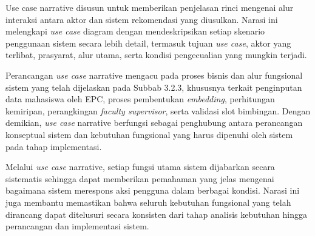 Use case narrative disusun untuk memberikan penjelasan rinci mengenai alur interaksi antara aktor dan sistem rekomendasi yang diusulkan. Narasi ini melengkapi \textit{use case} diagram dengan mendeskripsikan setiap skenario penggunaan sistem secara lebih detail, termasuk tujuan \textit{use case}, aktor yang terlibat, prasyarat, alur utama, serta kondisi pengecualian yang mungkin terjadi.

Perancangan \textit{use case} narrative mengacu pada proses bisnis dan alur fungsional sistem yang telah dijelaskan pada Subbab 3.2.3, khususnya terkait penginputan data mahasiswa oleh EPC, proses pembentukan \textit{embedding}, perhitungan kemiripan, perangkingan \textit{faculty supervisor}, serta validasi slot bimbingan. Dengan demikian, \textit{use case} narrative berfungsi sebagai penghubung antara perancangan konseptual sistem dan kebutuhan fungsional yang harus dipenuhi oleh sistem pada tahap implementasi.

Melalui \textit{use case} narrative, setiap fungsi utama sistem dijabarkan secara sistematis sehingga dapat memberikan pemahaman yang jelas mengenai bagaimana sistem merespons aksi pengguna dalam berbagai kondisi. Narasi ini juga membantu memastikan bahwa seluruh kebutuhan fungsional yang telah dirancang dapat ditelusuri secara konsisten dari tahap analisis kebutuhan hingga perancangan dan implementasi sistem.

